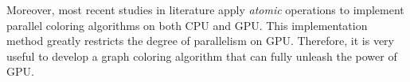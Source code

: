 
Moreover, most recent studies in literature  \cite{Manycore} apply \textit{atomic} operations to implement parallel coloring algorithms on both CPU and GPU. This implementation method greatly restricts the degree of parallelism on GPU. Therefore, it is very useful to develop a graph coloring algorithm that can fully unleash the power of GPU. 
